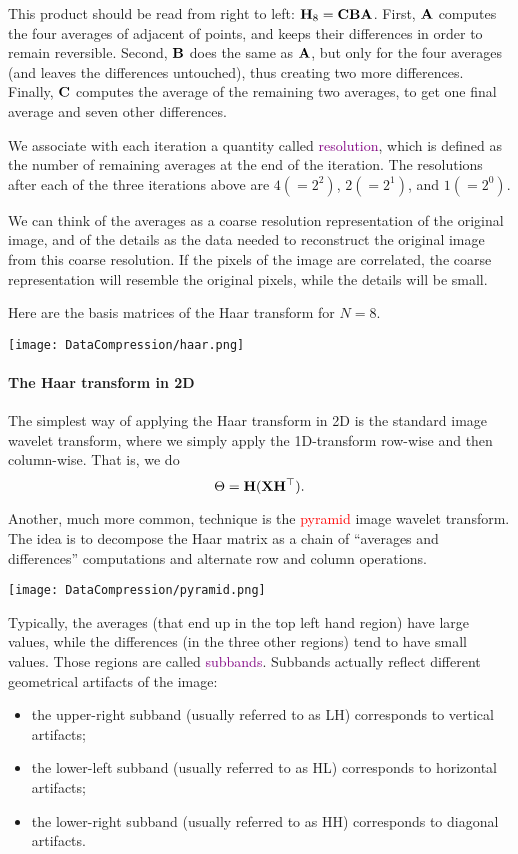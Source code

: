 \documentclass[a4paper, 11pt, openany]{book}
\numberwithin{equation}{section}
\theoremstyle{plain}
\theoremstyle{definition}
\newcommand{\Important}[1]{\textcolor{red}{#1}}
\newcommand{\Define}[1]{\textcolor{purple}{#1}}
\begin{document}
This product should be read from right to left: ${\bf H}_8 = {\bf C}{\bf B}{\bf A}$. First, ${\bf A}$ computes the four averages of adjacent of points, and keeps their differences in order to remain reversible. Second, ${\bf B}$ does the same as ${\bf A}$, but only for the four averages (and leaves the differences untouched), thus creating two more differences. Finally, ${\bf C}$ computes the average of the remaining two averages, to get one final average and seven other differences.

We associate with each iteration a quantity called \Define{resolution}, which is defined as the number of remaining averages at the end of the iteration. The resolutions after each of the three iterations above are $4(= 2^2)$, $2(= 2^1)$, and $1(= 2^0)$.

We can think of the averages as a coarse resolution representation of
the original image, and of the details as the data needed to reconstruct the original image from this coarse resolution. If the pixels of the image are correlated, the coarse representation will resemble the original pixels, while the details will be small.

Here are the basis matrices of the Haar transform for $N = 8$.

\begin{center}
\texttt{[image: DataCompression/haar.png]}
\end{center}

\paragraph{The Haar transform in 2D}
The simplest way of applying the Haar transform in 2D is the standard image wavelet transform, where we simply apply the 1D-transform row-wise and then column-wise. That is, we do
\[
    \Theta = {\bf H} ({\bf X}{\bf H}^\top).
\]

Another, much more common, technique is the \Important{pyramid} image wavelet transform. The idea is to decompose the Haar matrix as a chain of ``averages and differences'' computations and alternate row and column operations. 

\begin{center}
\texttt{[image: DataCompression/pyramid.png]}
\end{center}


Typically, the averages (that end up in the top left hand region) have large values, while the differences (in the three other regions) tend to have small values. Those regions are called \Define{subbands}. Subbands actually reflect different geometrical artifacts of the image:
\begin{itemize}
    \item  the upper-right subband (usually referred to as LH) corresponds to vertical artifacts;

    \item the lower-left subband (usually referred to as HL) corresponds to horizontal artifacts;
    
    \item the lower-right subband (usually referred to as HH) corresponds to diagonal artifacts.
\end{itemize}
\end{document}
